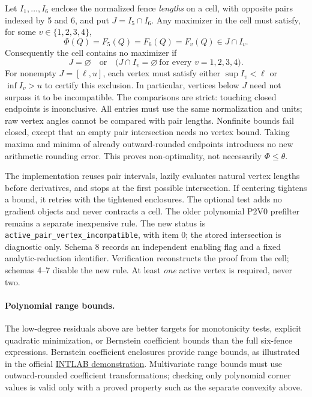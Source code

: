 \documentclass[11pt]{article}
\begin{document}
Let $I_1,\ldots,I_6$ enclose the normalized fence \emph{lengths} on a cell,
with opposite pairs indexed by 5 and 6, and put $J=I_5\cap I_6$.
Any maximizer in the cell must satisfy, for some $v\in\{1,2,3,4\}$,
\[
           \Phi(Q)=F_5(Q)=F_6(Q)=F_v(Q)\in J\cap I_v.
\]
Consequently the cell contains no maximizer if
\[
 J=\varnothing\quad\text{or}\quad
 \bigl(J\cap I_v=\varnothing\ \text{for every }v=1,2,3,4\bigr).
\]
For nonempty $J=[\ell,u]$, each vertex must satisfy either
$\sup I_v<\ell$ or $\inf I_v>u$ to certify this exclusion.
In particular, vertices below $J$ need not surpass it to be incompatible.
The comparisons are strict: touching closed endpoints is inconclusive.
All entries must use the same normalization and units; raw vertex angles
cannot be compared with pair lengths. Nonfinite bounds fail closed, except
that an empty pair intersection needs no vertex bound. Taking maxima and
minima of already outward-rounded endpoints introduces no new arithmetic
rounding error. This proves non-optimality, not necessarily $\Phi\le\theta$.

The implementation reuses pair intervals, lazily evaluates natural vertex
lengths before derivatives, and stops at the first possible intersection.
If centering tightens a bound, it retries with the tightened enclosures.
The optional test adds no gradient objects and never contracts a cell.
The older polynomial P2V0 prefilter remains a separate inexpensive rule.
The new status is \texttt{active\_pair\_vertex\_incompatible}, with item 0;
the stored intersection is diagnostic only. Schema 8 records an independent
enabling flag and a fixed analytic-reduction identifier. Verification
reconstructs the proof from the cell; schemas 4--7 disable the new rule.
At least \emph{one} active vertex is required, never two.

\paragraph{Polynomial range bounds.}
The low-degree residuals above are better targets for monotonicity tests,
explicit quadratic minimization, or Bernstein coefficient bounds than the
full six-fence expressions. Bernstein coefficient enclosures provide range
bounds, as illustrated in the official
\href{https://www.tuhh.de/ti3/rump/intlab/demos/html/dintlab.html}
{INTLAB demonstration}. Multivariate range bounds must use outward-rounded
coefficient transformations; checking only polynomial corner values is
valid only with a proved property such as the separate convexity above.
\end{document}
